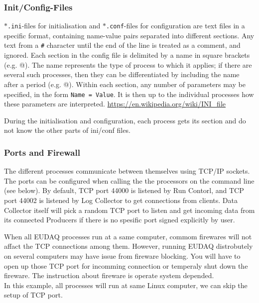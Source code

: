 \subsubsection{Init/Config-Files}\label{sec:ConfigFiles}
\texttt{$\ast$.ini}-files for initialisation and \texttt{$\ast$.conf}-files for configuration
are text files in a specific format, containing name-value pairs separated into different sections.
Any text from a \texttt{\#} character until the end of the line is treated as a comment, and
ignored.  
Each section in the config file is delimited by a name in square brackets
(e.g. \verb@[RunControl]@).  
The name represents the type of process to which it applies; if there
are several such processes, then they can be differentiated by including the name after a period
(e.g. @).  
Within each section, any number of parameters may be specified,
in the form \mbox{\texttt{Name = Value}}.  
It is then up to the individual processes how these parameters are interpreted.
\url{https://en.wikipedia.org/wiki/INI\_file}

During the initialisation and configuration, each process gets its section and do not know the other parts of ini/conf files.


\subsubsection{Ports and Firewall}
The different processes communicate between themselves using TCP/IP sockets. The ports can be configured when calling the the processors on the command line (see below). By default, TCP port 44000 is listened by Run Contorl, and TCP port 44002 is listened by Log Collector to get connections from clients. Data Collector itself will pick a random TCP port to listen and get incoming data from its connected Producers if there is no spesific port signed explicitly by user.

When all EUDAQ processes run at a same computer, commom firewares will not affact the TCP connections among them. However, running EUDAQ distrobutely on several computers may have issue from fireware blocking. You will have to open up those TCP port for incomming connection or temperaly shut down the fireware. The instruction about fireware is operate system depended.\\

In this example, all processes will run at same Linux computer, we can skip the setup of TCP port.

